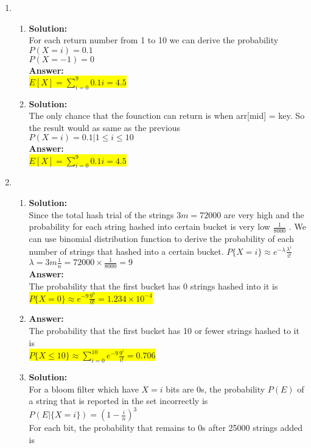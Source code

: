 \documentclass{article}
\newcommand{\myansw}{\textbf{Answer:}\\}
\newcommand{\mysolu}{\textbf{Solution:}\\}
\begin{document}
\begin{enumerate}
	\item
	\begin{enumerate}
		\item
		\mysolu
		For each return number from 1 to 10 we can derive the probability\\
		$P(X=i) = 0.1$\\
		$P(X = -1) = 0$\\
		\myansw
		\colorbox{yellow}{$E[X] = \sum\limits_{i=0}^{9}0.1i =4.5$}\\
		\item
		\mysolu
		The only chance that the founction can return is when arr[mid] = key. So the result would as same as the previous\\
		$P(X=i) = 0.1 | 1\leq i \leq 10$\\
		\myansw
		\colorbox{yellow}{$E[X] = \sum\limits_{i=0}^{9}0.1i =4.5$}\\
	\end{enumerate}
	\item 
	\begin{enumerate}
		\item
		\mysolu
		Since the total hash trial of the strings ${3m = 72000}$ are very high and the probability for each string hashed into certain bucket is very low ${\frac{1}{8000}}$ . We can use binomial distribution function to derive the probability of each number of strings that hashed into a certain bucket.
		$P\{X=i\} \approx e^{- \lambda}\frac{\lambda^i}{i!}$\\
		${\lambda = 3m \frac{1}{n} = 72000 \times 
		\frac{1}{8000} = 9}$\\
		\myansw
		The probability that the first bucket has 0 strings hashed into it is\\
		\colorbox{yellow}{
			${P\{X = 0\} \approx e^{-9}\frac{9^0}{0!}=1.234\times 10^{-4}}$
		}\\
		\item
		\myansw
		The probability that the first bucket has 10 or fewer strings hashed to it is\\
		\colorbox{yellow}{
			${P\{X \leq 10\} \approx \sum\limits_{i=0}^{10} e^{-9}\frac{9^i}{i!}=0.706}$
		}
		\item
		\mysolu
		For a bloom filter which have ${X = i}$ bits are 0s, the probability ${P(E)}$ of a string that is reported in the set incorrectly is\\
		${P(E|\{X = i\})= (1-\frac{i}{n})^3}$\\
		For each bit, the probability that remains to 0s after 25000 strings added is\\

\end{enumerate}
\end{enumerate}
\end{document}
